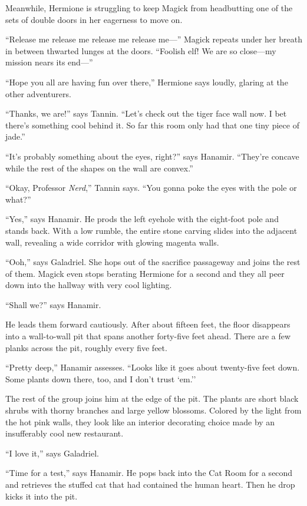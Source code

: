 \documentclass[smalldemyvopaper,11pt,twoside,onecolumn,openright,extrafontsizes]{memoir}
\newlength\drop
\begin{document}
Meanwhile, Hermione is struggling to keep Magick from headbutting one of
the sets of double doors in her eagerness to move on.

``Release me release me release me release me---'' Magick repeats under
her breath in between thwarted lunges at the doors. ``Foolish elf! We
are so close---my mission nears its end---''

``Hope you all are having fun over there,'' Hermione says loudly,
glaring at the other adventurers.

``Thanks, we are!'' says Tannin. ``Let's check out the tiger face wall
now. I bet there's something cool behind it. So far this room only had
that one tiny piece of jade.''

``It's probably something about the eyes, right?'' says Hanamir.
``They're concave while the rest of the shapes on the wall are convex.''

``Okay, Professor \emph{Nerd},'' Tannin says. ``You gonna poke the eyes
with the pole or what?''

``Yes,'' says Hanamir. He prods the left eyehole with the eight-foot
pole and stands back. With a low rumble, the entire stone carving slides
into the adjacent wall, revealing a wide corridor with glowing magenta
walls.

``Ooh,'' says Galadriel. She hops out of the sacrifice passageway and
joins the rest of them. Magick even stops berating Hermione for a second
and they all peer down into the hallway with very cool lighting.

``Shall we?'' says Hanamir.

He leads them forward cautiously. After about fifteen feet, the floor
disappears into a wall-to-wall pit that spans another forty-five feet
ahead. There are a few planks across the pit, roughly every five feet.

``Pretty deep,'' Hanamir assesses. ``Looks like it goes about
twenty-five feet down. Some plants down there, too, and I don't trust
`em.''

The rest of the group joins him at the edge of the pit. The plants are
short black shrubs with thorny branches and large yellow blossoms.
Colored by the light from the hot pink walls, they look like an interior
decorating choice made by an insufferably cool new restaurant.

``I love it,'' says Galadriel.

``Time for a test,'' says Hanamir. He pops back into the Cat Room for a
second and retrieves the stuffed cat that had contained the human heart.
Then he drop kicks it into the pit.
\end{document}
